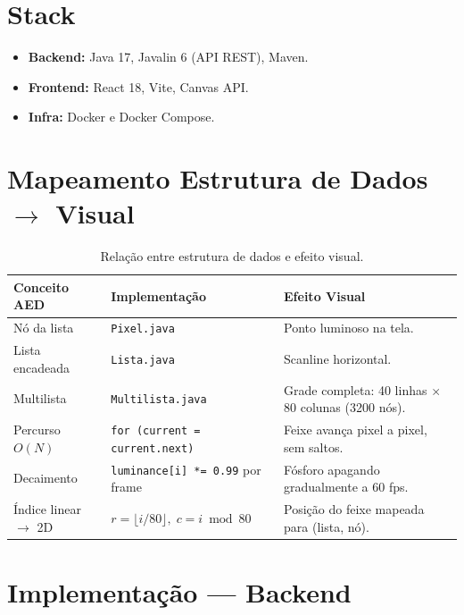 \documentclass[12pt, a4paper]{article}
\begin{document}
\section{Stack}
\begin{itemize}
    \item \textbf{Backend:} Java 17, Javalin 6 (API REST), Maven.
    \item \textbf{Frontend:} React 18, Vite, Canvas API.
    \item \textbf{Infra:} Docker e Docker Compose.
\end{itemize}

\section{Mapeamento Estrutura de Dados $\rightarrow$ Visual}

\begin{table}[H]
    \centering
    \footnotesize
    \begin{tabularx}{\textwidth}{>{\hsize=0.8\hsize}X >{\hsize=1.1\hsize}X >{\hsize=1.1\hsize}X}
        \toprule
        \textbf{Conceito AED} & \textbf{Implementação} & \textbf{Efeito Visual} \\
        \midrule
        Nó da lista & \texttt{Pixel.java} & Ponto luminoso na tela. \\
        \midrule
        Lista encadeada & \texttt{Lista.java} & Scanline horizontal. \\
        \midrule
        Multilista & \texttt{Multilista.java} & Grade completa: 40 linhas $\times$ 80 colunas (3200 nós). \\
        \midrule
        Percurso $O(N)$ & \texttt{for (current = current.next)} & Feixe avança pixel a pixel, sem saltos. \\
        \midrule
        Decaimento & \texttt{luminance[i] *= 0.99} por frame & Fósforo apagando gradualmente a 60 fps. \\
        \midrule
        Índice linear $\rightarrow$ 2D & $r = \lfloor i/80 \rfloor,\; c = i \bmod 80$ & Posição do feixe mapeada para (lista, nó). \\
        \bottomrule
    \end{tabularx}
    \caption{Relação entre estrutura de dados e efeito visual.}
\end{table}

\section{Implementação — Backend}
\end{document}
